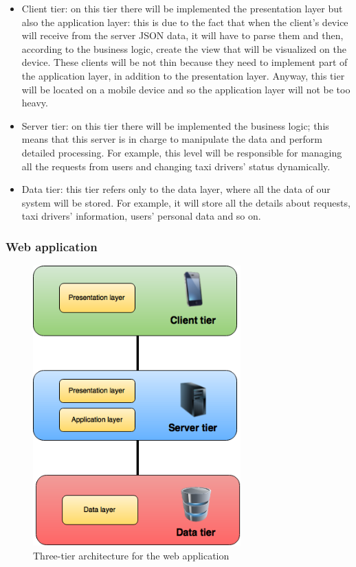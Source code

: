     \begin{itemize}
        \item Client tier: on this tier there will be implemented the presentation layer but also the application layer: this is due to the fact that when the client's device will receive from the server JSON data, it will have to parse them and then, according to the business logic, create the view that will be visualized on the device.
        These clients will be not thin because they need to implement part of the application layer, in addition to the presentation layer. Anyway, this tier will be located on a mobile device and so the application layer will not be too heavy.
        \item Server tier: on this tier there will be implemented the business logic; this means that this server is in charge to manipulate the data and perform detailed processing. For example, this level will be responsible for managing all the requests from users and changing taxi drivers' status dynamically. 
        \item Data tier: this tier refers only to the data layer, where all the data of our system will be stored. For example, it will store all the details about requests, taxi drivers' information, users' personal data and so on.
    \end{itemize}

\subsubsection{Web application}

    \begin{figure}[H]
        \centering
        \includegraphics[width=8cm]{./Images/WebApplication.png}
        \caption{Three-tier architecture for the web application}
    \end{figure}
    
